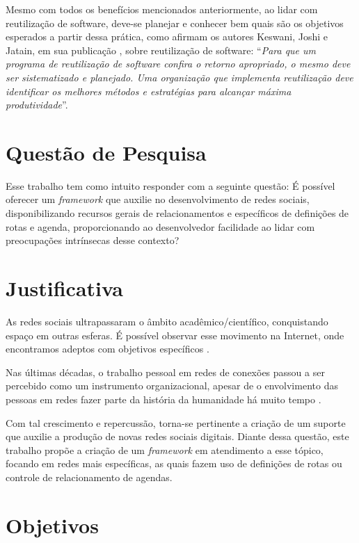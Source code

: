 Mesmo com todos os benefícios mencionados anteriormente, ao lidar com reutilização de software, deve-se planejar e conhecer bem quais são os objetivos esperados a partir dessa prática, como afirmam os autores Keswani, Joshi e Jatain, em sua publicação  \cite{Keswani:Joshi:Jatain:2014}, sobre reutilização de software: ``\textit{Para que um programa de reutilização de software confira o retorno apropriado, o mesmo deve ser sistematizado e planejado. Uma organização que implementa reutilização deve identificar os melhores métodos e estratégias para alcançar máxima produtividade}''.

\section{Questão de Pesquisa}

Esse trabalho tem como intuito responder com a seguinte questão: É possível oferecer um \textit{framework} que auxilie no desenvolvimento de redes sociais, disponibilizando recursos gerais de relacionamentos e específicos de definições de rotas e agenda, proporcionando ao desenvolvedor facilidade ao lidar com preocupações intrínsecas desse contexto?

\section{Justificativa}

As redes sociais ultrapassaram o âmbito acadêmico/científico, conquistando espaço em outras esferas. É possível observar esse movimento na Internet, onde encontramos adeptos com objetivos específicos \cite{Tomae:Alcara:Chiara:2005}.

Nas últimas décadas, o trabalho pessoal em redes de conexões passou a ser percebido como um instrumento organizacional, apesar de o envolvimento das pessoas em redes fazer parte da história da humanidade há muito tempo \cite{Tomae:Alcara:Chiara:2005}.

Com tal crescimento e repercussão, torna-se pertinente a criação de um suporte que auxilie a produção de novas redes sociais digitais. Diante dessa questão, este trabalho propõe a criação de um \textit{framework} em atendimento a esse tópico, focando em redes mais específicas, as quais fazem uso de definições de rotas ou controle de relacionamento de agendas.

\section{Objetivos}

